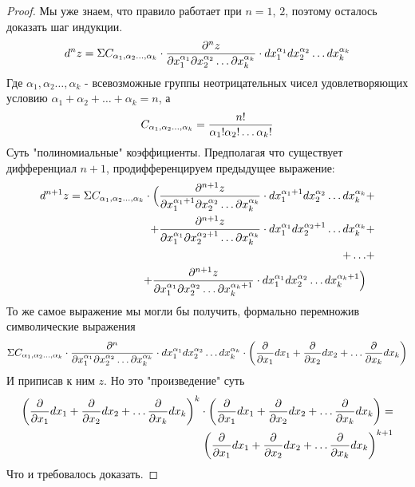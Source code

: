 \begin{proof}
	Мы уже знаем, что правило работает при $n =1$, $2$, поэтому осталось доказать шаг индукции.\newline
	$$d^nz = \Sigma
	C_{
		\alpha_1,
		\alpha_2
		\dots,
		\alpha_k
		}
	\cdot
	{\partial^nz \over 
	\partial x_1^{\alpha_1}
	\partial x_2^{\alpha_2}
	\dots
	\partial x_k^{\alpha_k}
	}
	\cdot
	dx_1^{\alpha_1}
	dx_2^{\alpha_2}
	\dots
	dx_k^{\alpha_k}
	$$
Где $
		\alpha_1,
		\alpha_2
		\dots,
		\alpha_k$ - всевозможные группы неотрицательных чисел удовлетворяющих условию $ \alpha_1 + \alpha_2 + \dots + \alpha_k = n$, а
$$
	C_{
		\alpha_1,
		\alpha_2
		\dots,
		\alpha_k
	} = 
	{n! \over
	\alpha_1!
	\alpha_2!
	\dots
	\alpha_k!}
	$$
Суть "полиномиальные" коэффициенты.
	\newline
	\newline
Предполагая что существует дифференциал $n + 1$, продифференцируем предыдущее выражение:
	\begin{align*}d^{n+1}z = \Sigma
	C_{
		\alpha_1,
		\alpha_2
		\dots,
		\alpha_k
		}
		\cdot\Big(
	{\partial^{n+1}z \over 
	\partial x_1^{\alpha_1 + 1}
	\partial x_2^{\alpha_2}
	\dots
	\partial x_k^{\alpha_k}
	}
	\cdot
	dx_1^{\alpha_1 + 1}
	dx_2^{\alpha_2}
	\dots
		dx_k^{\alpha_k} &+\\+
		{\partial^{n+1}z \over 
	\partial x_1^{\alpha_1}
	\partial x_2^{\alpha_2 + 1}
	\dots
	\partial x_k^{\alpha_k}
	}
	\cdot
	dx_1^{\alpha_1}
	dx_2^{\alpha_2 + 1}
	\dots
	dx_k^{\alpha_k}
		&+\\+
		\dots 
		&+\\+
		{\partial^{n+1}z \over 
	\partial x_1^{\alpha_1}
	\partial x_2^{\alpha_2}
	\dots
	\partial x_k^{\alpha_k + 1}
	}
	\cdot
	dx_1^{\alpha_1}
	dx_2^{\alpha_2}
	\dots
	dx_k^{\alpha_k + 1}\Big)
	\end{align*}
	То же самое выражение мы могли бы получить, формально перемножив символические выражения
	$$\Sigma
	C_{
		\alpha_1,
		\alpha_2
		\dots,
		\alpha_k
		}
	\cdot
	{\partial^n \over 
	\partial x_1^{\alpha_1}
	\partial x_2^{\alpha_2}
	\dots
	\partial x_k^{\alpha_k}
	}
	\cdot
	dx_1^{\alpha_1}
	dx_2^{\alpha_2}
	\dots
	dx_k^{\alpha_k} \cdot
	\left(
	{\partial \over \partial x_1}dx_1 + 
	{\partial \over \partial x_2}dx_2 + 
	\dots
	{\partial \over \partial x_k}dx_k
	\right)
	$$
	И приписав к ним $z$.
	Но это "произведение" суть
	\begin{align*}
	\left(
	{\partial \over \partial x_1}dx_1 + 
	{\partial \over \partial x_2}dx_2 + 
	\dots
	{\partial \over \partial x_k}dx_k
	\right)^k
	\cdot
		\left(
	{\partial \over \partial x_1}dx_1 + 
	{\partial \over \partial x_2}dx_2 + 
	\dots
	{\partial \over \partial x_k}dx_k
	\right) = \\
		\left(
	{\partial \over \partial x_1}dx_1 + 
	{\partial \over \partial x_2}dx_2 + 
	\dots
	{\partial \over \partial x_k}dx_k
		\right)^{k+1}
	\end{align*}
	Что и требовалось доказать.
\end{proof}

